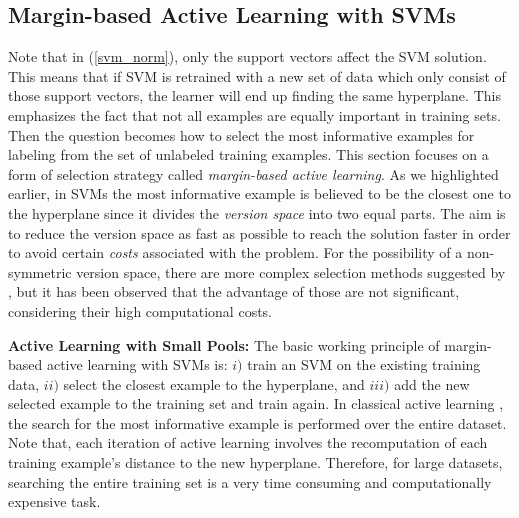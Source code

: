 \subsection{Margin-based Active Learning with SVMs}
\label{ALpools}
Note that in (\ref{svm_norm}), only the support vectors affect the SVM solution. This means that if SVM is retrained with a new set of data which only consist of those support vectors, the learner will end up finding the same hyperplane. This emphasizes the fact that not all examples are equally important in training sets. Then the question becomes how to select the most informative examples for labeling from the set of unlabeled training examples. This section focuses on a form of selection strategy called \textit{margin-based active learning}. As we highlighted earlier, in SVMs the most informative example is believed to be the closest one to the hyperplane since it divides the \textit{version space} into two equal parts. The aim is to reduce the version space as fast as possible to reach the solution faster in order to avoid certain \textit{costs} associated with the problem. For the possibility of a non-symmetric version space, there are more complex selection methods suggested by \cite{Tong_2002}, but it has been observed that the advantage of those are not significant, considering their high computational costs.

\textbf{Active Learning with Small Pools:}
 The basic working principle of margin-based active learning with SVMs is: $i)$ train an SVM on the existing training data, $ii)$ select the closest example to the hyperplane, and $iii)$ add the new selected example to the training set and train again. In classical active learning \cite{Tong_2002}, the search for the most informative example is performed over the entire dataset. Note that, each iteration of active learning involves the recomputation of each training example's distance to the new hyperplane. Therefore, for large datasets, searching the entire training set is a very time consuming and computationally expensive task.

